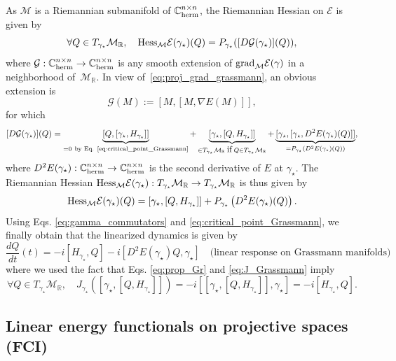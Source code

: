 \documentclass[11pt]{article}
\def\R{{\mathbb R}}
\def\C{{\mathbb C}}
\begin{document}
As $\mathcal M$ is a Riemannian submanifold of $\C^{n \times n}_{\rm herm}$, the Riemannian Hessian on $\mathcal E$ is given by 
$$
\forall Q \in T_{\gamma_\star} \mathcal M_\R, \quad {\rm Hess}_{\mathcal M} \mathcal E(\gamma_\star) (Q) = P_{\gamma_\star}( [D\mathcal G(\gamma_\star)](Q) ),
$$
where $\mathcal G: \C^{n \times n}_{\rm herm} \to \C^{n \times n}_{\rm herm}$ is any smooth extension of ${\rm grad}_{\mathcal M} \mathcal E(\gamma)$ in a neighborhood of~$\mathcal M_\R$. In view of~\eqref{eq:proj_grad_grassmann}, an obvious extension is
$$
\mathcal G(M) := [M,[M,\nabla E(M)]],
$$
for which 
$$
[D\mathcal G(\gamma_\star)](Q)=  \underbrace{[Q,[\gamma_\star,H_{\gamma_\star}]]}_{=0~\text{by Eq. \eqref{eq:critical_point_Grassmann}}} + \underbrace{[\gamma_\star,[Q,H_{\gamma_\star}]]}_{\in T_{\gamma_\star}\mathcal M_\R \; \mbox{\rm if} \; Q \in T_{\gamma_\star}\mathcal M_\R} +\underbrace{[\gamma_\star,[\gamma_\star,D^2E(\gamma_\star)(Q)]]}_{=P_{\gamma_\star}(D^2E(\gamma_\star)(Q))},
$$
where $D^2E(\gamma_\star):  \C^{n \times n}_{\rm herm} \to \C^{n \times n}_{\rm herm}$ is the second derivative of $E$ at $\gamma_\star$. The Riemannian Hessian ${\rm Hess}_{\mathcal M}\mathcal E(\gamma_\star) : T_{\gamma_\star} \mathcal M _\R \to T_{\gamma_\star} \mathcal M_\R$ is thus given by
\begin{equation} \label{eq:Hessian_Grassmann}
{\rm Hess}_{\mathcal M}\mathcal E(\gamma_\star) (Q) = [\gamma_\star,[Q,H_{\gamma_\star}]] +  P_{\gamma_\star} \left( D^2E(\gamma_\star) (Q) \right).
\end{equation}
Using Eqs. \eqref{eq:gamma_commutators} and \eqref{eq:critical_point_Grassmann}, we finally obtain that the linearized dynamics is given by
\begin{equation}\label{eq:linearized_dynamics_GM}
{\frac{dQ}{dt}(t) = -i [H_{\gamma_\star},Q] - i [D^2E(\gamma_\star)Q,\gamma_\star] \quad \mbox{(linear response on Grassmann manifolds)}}
\end{equation}
where we used the fact that Eqs. \eqref{eq:prop_Gr} and \eqref{eq:J_Grassmann} imply
$$
\forall Q \in T_{\gamma_\star}\mathcal M_\R, \quad J_{\gamma_\star} \left([ \gamma_\star,[Q,H_{\gamma_\star}]] \right) = -i [[ \gamma_\star,[Q,H_{\gamma_\star}]] ,\gamma_\star] = -i [H_{\gamma_\star},Q].
$$


\subsection{Linear energy functionals on projective spaces (FCI)}
\label{subsec:linear_functionals}
\end{document}
